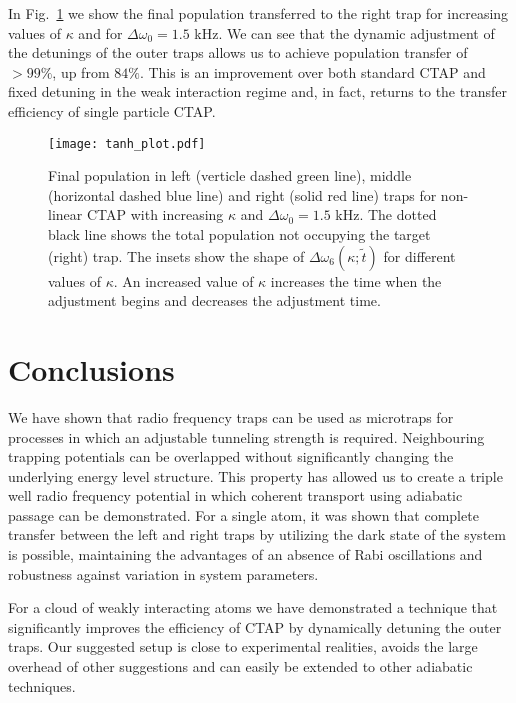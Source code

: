 In Fig.~\ref{Fig:tanh} we show the final population transferred to the
right trap for increasing values of $\kappa$ and for
$\Delta \omega_0=1.5$ kHz. We can see that the dynamic adjustment of the
detunings of the outer traps allows us to achieve population transfer
of $>99 \%$, up from $84 \%$. This is an improvement over both
standard CTAP and fixed detuning in the weak interaction regime and,
in fact, returns to the transfer efficiency of single particle CTAP.

\begin{figure}
  \texttt{[image: tanh\_plot.pdf]}
  \caption{Final population in left (verticle dashed green line), middle
    (horizontal dashed blue line) and right (solid red line) traps for
    non-linear CTAP with increasing $\kappa$ and $\Delta \omega_0=1.5$ kHz. The
    dotted black line shows the total population not occupying the target
    (right) trap. The insets show the shape of $\Delta\omega_6(\kappa;\tilde t)$ for different 
    values of $\kappa$. An increased value of $\kappa$ increases the time 
    when the adjustment begins and decreases the adjustment time.}
\label{Fig:tanh}
\end{figure}


\section{Conclusions}
We have shown that radio frequency traps can be used as microtraps for
processes in which an adjustable tunneling strength is
required. Neighbouring trapping potentials can be overlapped without
significantly changing the underlying energy level structure. This
property has allowed us to create a triple well radio frequency
potential in which coherent transport using adiabatic passage can be
demonstrated. For a single atom, it was shown that complete transfer
between the left and right traps by utilizing the dark state of the
system is possible, maintaining the advantages of an absence of Rabi
oscillations and robustness against variation in system parameters.

For a cloud of weakly interacting atoms we have demonstrated a
technique that significantly improves the efficiency of CTAP by
dynamically detuning the outer traps. Our suggested setup is close to
experimental realities, avoids the large overhead of other suggestions
and can easily be extended to other adiabatic techniques.


